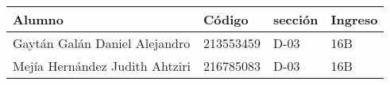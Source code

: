 \begin{table}[H]
    \begin{center}
        \begin{tabular}{l|l|l|l}
        \hline
        Alumno                         & Código    & sección &Ingreso    \\
        \hline
        Gaytán Galán Daniel Alejandro  & 213553459 & D-03 &  16B         \\
        Mejía Hernández Judith Ahtziri & 216785083 & D-03 &  16B         \\
        \hline
        \end{tabular}
    \end{center}
\end{table}
